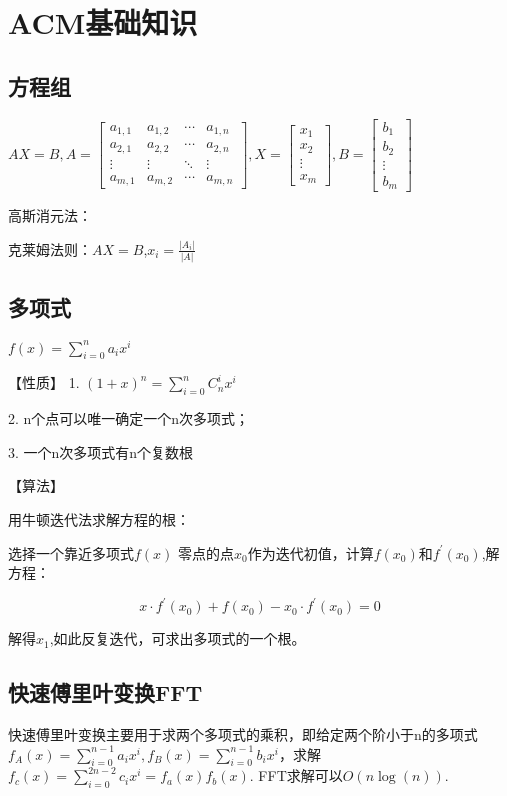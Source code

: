 \chapter{ACM基础知识}
\section{方程组}

$AX=B, A=\begin{bmatrix}
	a_{1,1} & a_{1,2} & \cdots & a_{1,n} \\
	a_{2,1} & a_{2,2} & \cdots & a_{2,n} \\
	\vdots  & \vdots  & \ddots & \vdots  \\
	a_{m,1} & a_{m,2} & \cdots & a_{m,n}
\end{bmatrix}, 
X=\begin{bmatrix}
x_{1}  \\
x_{2} \\
\vdots   \\
x_{m}
\end{bmatrix}, 
B=\begin{bmatrix}
b_{1}  \\
b_{2} \\
\vdots   \\
b_{m}
\end{bmatrix}$

高斯消元法：

克莱姆法则：$AX=B$,$x_i=\frac{|A_i|}{|A|}$

\section{多项式}
$f(x)=\sum_{i=0}^n{a_ix^i}$

【性质】
1. $(1+x)^n=\sum_{i=0}^n{C_n^ix^i}$

2. n个点可以唯一确定一个n次多项式；

3. 一个n次多项式有n个复数根

【算法】

用牛顿迭代法求解方程的根：

选择一个靠近多项式$f(x)$ 零点的点$x_0$作为迭代初值，计算$f(x_0)$和$f^{'}(x_0)$,解方程：

$$x\cdot f^{'}(x_0)+f(x_0)-x_0\cdot f^{'}(x_0)=0$$

解得$x_1$,如此反复迭代，可求出多项式的一个根。

\section{快速傅里叶变换FFT}
快速傅里叶变换主要用于求两个多项式的乘积，即给定两个阶小于n的多项式$f_{A}(x)=\sum_{i=0}^{n-1}{a_ix^i},f_{B}(x)=\sum_{i=0}^{n-1}{b_ix^i}$，求解$f_{c}(x)=\sum_{i=0}^{2n-2}{c_ix^i}=f_{a}(x)f_{b}(x)$.
 FFT求解可以$O(n\log(n))$.

